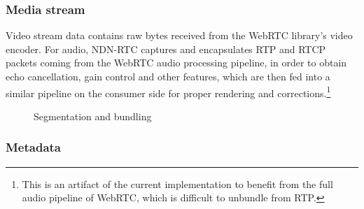 \documentclass{icn/sig-alternate-2013} %
\newcommand{\ndnrtcName}{NDN-RTC} %
\begin{document}
\subsubsection{Media stream}
Video stream data contains raw bytes received from the WebRTC library's video encoder. For audio, \ndnrtcName{} captures and encapsulates RTP and RTCP packets coming from the WebRTC audio processing pipeline, in order to obtain echo cancellation, gain control and other features, which are then fed into a similar pipeline on the consumer side for proper rendering and corrections.\footnote{This is an artifact of the current implementation to benefit from the full audio pipeline of WebRTC, which is difficult to unbundle from RTP.}

\begin{figure}[t!]
\centering
{}
\caption{Segmentation and bundling}
\label{fig:packetmeta}
\end{figure}

\subsubsection{Metadata}
\end{document}
